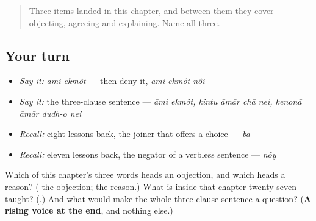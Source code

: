 \label{lesson:BN-R18-agree-and-differ}



\begin{quote}
Three items landed in this chapter, and between them they cover objecting, agreeing and explaining. Name all three.
\end{quote}

\subsection*{Your turn}
\begin{itemize}
\raggedright
  \item \emph{Say it:} \emph{āmi ekmôt} — then deny it, \emph{āmi ekmôt nôi}
  \item \emph{Say it:} the three-clause sentence — \emph{āmi ekmôt, kintu āmār chā nei, kenonā āmār dudh-o nei}
  \item \emph{Recall:} eight lessons back, the joiner that offers a choice — \emph{bā}
  \item \emph{Recall:} eleven lessons back, the negator of a verbless sentence — \emph{nôy}
\end{itemize}

\begin{tcolorbox}[breakable,colback=teal!4,colframe=teal!35!black,title={Before you move on}]
Which of this chapter's three words heads an objection, and which heads a reason? (\textbf{} the objection; \textbf{} the reason.) What is inside \textbf{} that chapter twenty-seven taught? (\textbf{}.) And what would make the whole three-clause sentence a question? (\textbf{A rising voice at the end}, and nothing else.)
\end{tcolorbox}
